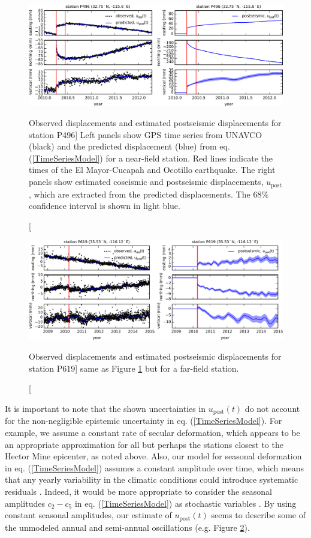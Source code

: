 \begin{figure}
\includegraphics[scale=0.9]{ch3/figures/2016jb013114-p02}
\caption
[Observed displacements and estimated postseismic displacements
for station P496] 
{Left panels show GPS time series from UNAVCO (black) and the
predicted displacement (blue) from eq. (\ref{TimeSeriesModel}) for a
near-field station.  Red lines indicate the times of the El
Mayor-Cucapah and Ocotillo earthquake. The right panels show estimated
coseismic and postseismic displacements, $u_\mathrm{post}$, which are
extracted from the predicted displacements.  The 68\% confidence
interval is shown in light blue.}
\label{ch3:fig:P496}
\end{figure}

\begin{figure}
\noindent\includegraphics[scale=0.9]{ch3/figures/2016jb013114-p03}
\caption
[Observed displacements and estimated postseismic displacements
for station P619] 
{same as Figure \ref{ch3:fig:P496} but for a far-field station.} 
\label{ch3:fig:P619}
\end{figure}

It is important to note that the shown uncertainties in
$u_\mathrm{post}(t)$ do not account for the non-negligible epistemic
uncertainty in eq. (\ref{TimeSeriesModel}).  For example, we assume a
constant rate of secular deformation, which appears to be an
appropriate approximation for all but perhaps the stations closest to
the Hector Mine epicenter, as noted above.  Also, our model for
seasonal deformation in eq. (\ref{TimeSeriesModel}) assumes a constant
amplitude over time, which means that any yearly variability in the
climatic conditions could introduce systematic residuals
\citep{Davis2012}. Indeed, it would be more appropriate to consider
the seasonal amplitudes $c_2-c_5$ in eq. (\ref{TimeSeriesModel}) as
stochastic variables \citep{Murray2005}. By using constant seasonal
amplitudes, our estimate of $u_\mathrm{post}(t)$ seems to describe
some of the unmodeled annual and semi-annual oscillations (e.g. Figure
\ref{ch3:fig:P619}).

